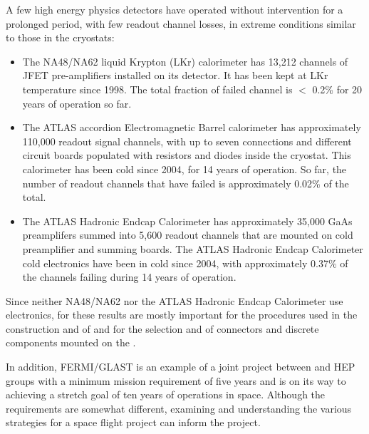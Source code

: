 A few high energy physics detectors have operated without intervention for a 
prolonged period, with few readout channel losses, in extreme 
conditions similar to those in the  cryostats:
\begin{itemize}
\item The NA48/NA62 liquid Krypton (LKr) calorimeter has 13,212 channels 
of JFET pre-amplifiers installed on its detector. It has been kept at LKr temperature 
since 1998. The total fraction of failed channel is $<$ 0.2\% for 20 years of operation so far.
\item The ATLAS  accordion Electromagnetic Barrel calorimeter has 
approximately 110,000 readout signal channels, with up to seven connections and different 
circuit boards populated with resistors and diodes inside the cryostat. This
calorimeter has been cold since 2004, for 14 years of operation. So far, the
number of readout channels that have failed is approximately 0.02\% of the total.
\item The ATLAS  Hadronic Endcap Calorimeter has approximately 35,000 GaAs
preamplifers summed into 5,600 readout channels that are mounted on cold preamplifier
and summing boards. The ATLAS  Hadronic Endcap 
Calorimeter cold electronics have been in cold since 2004, with approximately 
0.37\% of the channels failing during 14 years of operation. 
\end{itemize}
Since neither NA48/NA62 nor the ATLAS  Hadronic Endcap Calorimeter
use  electronics, for  these results are mostly important
for the procedures used in the construction and  of  and 
for the selection and  of connectors and discrete components mounted
on the .

In addition, FERMI/GLAST is an example of a joint project between  and HEP groups 
with a minimum mission requirement of five years and is on its way to achieving a 
stretch goal of ten years of operations in space. Although the requirements are somewhat 
different, examining and understanding the various strategies for a space 
flight project can inform the  project. 

